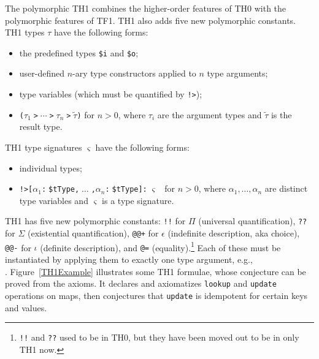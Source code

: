 \documentclass{easychair}
\begin{document}
The polymorphic TH1 combines the higher-order features of TH0 
with the polymorphic features of TF1.
TH1 also adds five new polymorphic constants.
TH1 types $\tau$ have the following forms:
\begin{itemize}
\item the predefined types {\tt \$i} and {\tt \$o};
\item user-defined $n$-ary type constructors applied to $n$ type arguments;
\item type variables (which must be quantified by {\tt !>});
\item {\tt ($\tau_1\;$>$\;{\cdots}\;$>$\;\tau_n\;$>$\;\tilde \tau$)}
      for $n > 0$, where $\tau_i$ are the argument types and $\tilde \tau$
      is the result type.
\end{itemize}
TH1 type signatures $\varsigma$ have the following forms:
\begin{itemize}
\item individual types;
\item {\tt !>[$\alpha_1$:$\;$\$tType,$\;{\dots}\;$,$\alpha_n$:$\;$\$tType]:$\;\varsigma$}
\ for $n > 0$, where $\alpha_1,\dots,\alpha_n$ are distinct
type variables and $\varsigma$ is a type signature.
\end{itemize}
TH1 has five new polymorphic constants:
{\tt !!} for $\Pi$ (universal quantification),
{\tt ??} for $\Sigma$ (existential quantification),
{\tt @@+} for $\epsilon$ (indefinite description, aka choice),
{\tt @@-} for $\iota$ (definite description), 
and  
{\tt @=} (equality).\footnote{%
{\tt !!} and {\tt ??} used to be in TH0, but they have been moved out to
be in only TH1 now.}
Each of these must be instantiated by applying them to exactly one type 
argument, e.g.,\\
\hspace*{1cm}{\tt ?$\;$[B:$\;$bird]$\;$:$\;$($\;$(@=$\;$@$\;$bird)$\;$@$\;$tweety$\;$@$\;$B$\;$)}.
Figure~\ref{TH1Example} illustrates some TH1 formulae, whose conjecture can
be proved from the axioms.
It declares and axiomatizes {\tt lookup} and {\tt update} operations on
maps, then conjectures that {\tt update} is idempotent for certain keys and
values.
\end{document}
